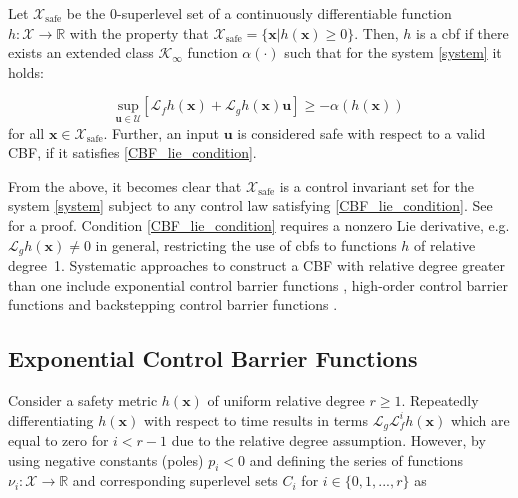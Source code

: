 \begin{definition}\label{def:cbf}
    Let $\mathcal{X}_\text{safe}$ be the $0$-superlevel set of a continuously differentiable function
    $h: \mathcal{X} \rightarrow \mathbb{R}$ with the property that $\mathcal{X}_\text{safe} = \{ \mathbf{x} | h(\mathbf{x})\geq 0 \}$. Then, $h$ is a \ac{cbf} if there exists an extended class $\mathcal{K}_\infty$ function $\alpha(\cdot)$ such that for the system \eqref{system} it holds:

    \small
    \begin{equation}\label{CBF_lie_condition}
        \underset{\mathbf{u} \in \mathcal{U}}{\text{sup}} [\mathcal{L}_f h(\mathbf{x}) + \mathcal{L}_g h(\mathbf{x}) \mathbf{u}] \geq -\alpha(h(\mathbf{x}))
    \end{equation}
    \normalsize
    for all $\mathbf{x} \in \mathcal{X}_\text{safe}$. Further, an input $\mathbf{u}$ is considered safe with respect to a valid CBF, if it satisfies \eqref{CBF_lie_condition}.
\end{definition}

From the above, it becomes clear that $\mathcal{X}_\text{safe}$ is a control invariant set for the system \eqref{system} subject to any control law satisfying \eqref{CBF_lie_condition}. See \cite{ames2016control} for a proof. Condition \eqref{CBF_lie_condition} requires a nonzero Lie derivative, e.g. $\mathcal{L}_g h(\mathbf{x}) \neq 0$ in general, restricting the use of \acp{cbf} to functions $h$ of relative degree~1. Systematic approaches to construct a CBF with relative degree greater than one include exponential control barrier functions \cite{ECBF}, high-order control barrier functions \cite{HOCBF} and backstepping control barrier functions \cite{BCBF}.

\subsection{Exponential Control Barrier Functions}
Consider a safety metric $h(\mathbf{x})$ of uniform relative degree $r\geq1$. Repeatedly differentiating $h(\mathbf{x})$ with respect to time results in terms $\mathcal{L}_g \mathcal{L}_f^{i} h(\mathbf{x})$ which are equal to zero for $i<r-1$ due to the relative degree assumption. However, by using negative constants (poles) $p_i<0$ and defining the series of functions $\nu_i: \mathcal{X} \rightarrow \mathbb{R}$ and corresponding superlevel sets $C_i$ for $i \in \{0,1, ...,r\}$ as


